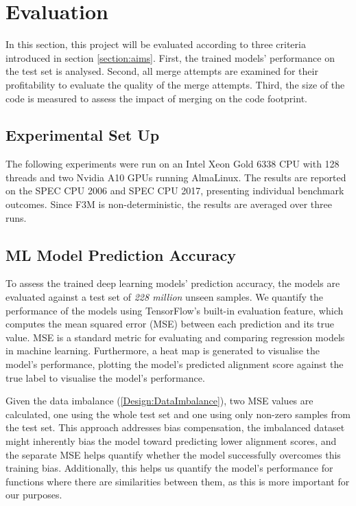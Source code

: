 \chapter{Evaluation}
In this section, this project will be evaluated according to three criteria introduced in section \ref{section:aims}. First, the trained models' performance on the test set is analysed. Second, all merge attempts are examined for their profitability to evaluate the quality of the merge attempts. Third, the size of the code is measured to assess the impact of merging on the code footprint.

\section{Experimental Set Up}
The following experiments were run on an Intel Xeon Gold 6338 CPU with 128 threads and two Nvidia A10 GPUs running AlmaLinux. The results are reported on the SPEC CPU 2006 and SPEC CPU 2017, presenting individual benchmark outcomes. Since F3M is non-deterministic, the results are averaged over three runs.

\section{ML Model Prediction Accuracy} \label{Eval:MLAccuracy}
To assess the trained deep learning models' prediction accuracy, the models are evaluated against a test set of \textit{228 million} unseen samples. We quantify the performance of the models using TensorFlow's built-in evaluation feature, which computes the mean squared error (MSE) between each prediction and its true value. MSE is a standard metric for evaluating and comparing regression models in machine learning. Furthermore, a heat map is generated to visualise the model's performance, plotting the model's predicted alignment score against the true label to visualise the model's performance.

Given the data imbalance (\ref{Design:DataImbalance}), two MSE values are calculated, one using the whole test set and one using only non-zero samples from the test set. This approach addresses bias compensation, the imbalanced dataset might inherently bias the model toward predicting lower alignment scores, and the separate MSE helps quantify whether the model successfully overcomes this training bias. Additionally, this helps us quantify the model's performance for functions where there are similarities between them, as this is more important for our purposes.

